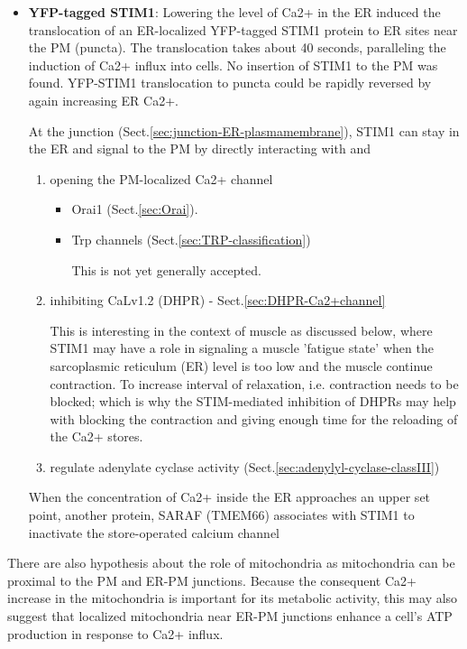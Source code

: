 \begin{itemize}
  \item   {\bf YFP-tagged STIM1}: 
Lowering the level of Ca2+ in the ER induced the translocation of an
ER-localized YFP-tagged STIM1 protein to ER sites near the PM (puncta).
The translocation takes about 40 seconds, paralleling the induction of Ca2+
influx into cells.  No insertion of STIM1 to the PM was found.
YFP-STIM1 translocation to puncta could be rapidly reversed by again increasing
ER Ca2+. 
 
At the junction (Sect.\ref{sec:junction-ER-plasmamembrane}), STIM1 can stay in
the ER and signal to the PM by directly interacting with and 
\begin{enumerate}
  \item opening the PM-localized Ca2+ channel
  \begin{itemize}
 
     \item   Orai1 (Sect.\ref{sec:Orai}).
  
    \item  Trp channels  (Sect.\ref{sec:TRP-classification})
  
  This is not yet generally accepted. 
  \end{itemize}
  
  \item inhibiting CaLv1.2 (DHPR) - Sect.\ref{sec:DHPR-Ca2+channel}
  
  This is interesting in the context of muscle as discussed below, where STIM1
  may have a role in signaling a muscle 'fatigue state' when the sarcoplasmic
  reticulum (ER) level is too low and the muscle continue contraction. To
  increase interval of relaxation, i.e. contraction needs to be blocked;
  which is why the STIM-mediated inhibition of DHPRs may help with blocking
  the contraction and giving enough time for the reloading of the Ca2+ stores.
 
 
 \item regulate adenylate cyclase activity (Sect.\ref{sec:adenylyl-cyclase-classIII})
\end{enumerate}

When the concentration of Ca2+ inside the ER approaches an upper set point,
another protein, SARAF (TMEM66) associates with STIM1 to inactivate the
store-operated calcium channel

\end{itemize}

There are also hypothesis about the role of mitochondria as mitochondria can be
proximal to the PM and ER-PM junctions. Because the consequent Ca2+ increase in
the mitochondria is important for its metabolic activity, this may also suggest
that localized mitochondria near ER-PM junctions enhance a cell's ATP production
in response to Ca2+ influx.


